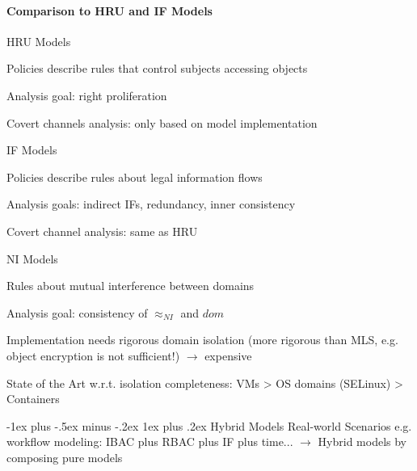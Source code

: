 \documentclass[a4paper]{article}
\makeatletter
\renewcommand{\subsubsection}{\@startsection{subsubsection}{3}{0mm}%
                                {-1ex plus -.5ex minus -.2ex}%
                                {1ex plus .2ex}%
                                {\normalfont\small\bfseries}}
\makeatother
\begin{document}
\begin{multicols}{3}
    \paragraph{Comparison to HRU and IF Models}
    \begin{itemize*}
        \item HRU Models
              \begin{itemize*}
                  \item Policies describe rules that control subjects accessing objects
                  \item Analysis goal: right proliferation
                  \item Covert channels analysis: only based on model implementation
              \end{itemize*}
        \item IF Models
              \begin{itemize*}
                  \item Policies describe rules about legal information flows
                  \item Analysis goals: indirect IFs, redundancy, inner consistency
                  \item Covert channel analysis: same as HRU
              \end{itemize*}
        \item NI Models
              \begin{itemize*}
                  \item Rules about mutual interference between domains
                  \item Analysis goal: consistency of $\approx_{NI}$ and $dom$
                  \item Implementation needs rigorous domain isolation (more rigorous than MLS, e.g. object encryption is not sufficient!) $\rightarrow$ expensive
                  \item State of the Art w.r.t. isolation completeness: VMs > OS domains (SELinux) > Containers
              \end{itemize*}
    \end{itemize*}

    \subsubsection{Hybrid Models}
    Real-world Scenarios e.g. workflow modeling: IBAC plus RBAC plus IF plus time... $\rightarrow$ Hybrid models by composing pure models


\end{multicols}
\end{document}
